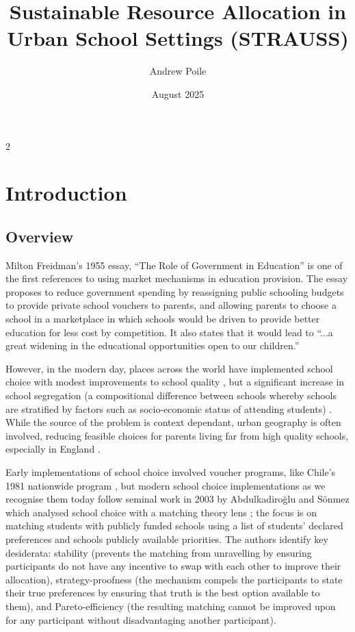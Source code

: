 \documentclass{article}
\title{Sustainable Resource Allocation in Urban School Settings (STRAUSS)}
\author{Andrew Poile}
\date{August 2025}
\begin{document}
\maketitle

\begin{multicols}{2}
\section{Introduction}
\subsection{Overview}
Milton Freidman's 1955 essay, \enquote{The Role of Government in Education} \cite{friedmanRoleGovernmentEducation1955} is one of the first references to using market mechanisms in education provision. The essay proposes to reduce government spending by reassigning public schooling budgets to provide private school vouchers to parents, and allowing parents to choose a school in a marketplace in which schools would be driven to provide better education for less cost by competition. It also states that it would lead to \enquote{...a great widening in the educational opportunities open to our children.}

However, in the modern day, places across the world have implemented school choice with modest improvements to school quality \cite{gibbonsChoiceCompetitionPupil2008,hsiehEffectsGeneralizedSchool2006,gleasonEvaluationCharterSchool,eppleSchoolVouchersSurvey2017,quintero-fragozoEffectsSpatialCompetition2023}, but a significant increase in school segregation (a compositional difference between schools whereby schools are stratified by factors such as socio-economic status of attending students) \cite{wilsonSchoolChoiceCity2019}. While the source of the problem is context dependant, urban geography is often involved, reducing feasible choices for parents living far from high quality schools, especially in England \cite{burgessParentalChoicePrimary2011a,burgessSchoolChoiceEngland2019}.

Early implementations of school choice involved voucher programs, like Chile's 1981 nationwide program \cite{hsiehEffectsGeneralizedSchool2006}, but modern school choice implementations as we recognise them today follow seminal work in 2003 by Abdulkadiroğlu and Sönmez which analysed school choice with a matching theory lens \cite{abdulkadirogluSchoolChoiceMechanism2003}; the focus is on matching students with publicly funded schools using a list of students' declared preferences and schools publicly available priorities. The authors identify key desiderata: stability (prevents the matching from unravelling by ensuring participants do not have any incentive to swap with each other to improve their allocation), strategy-proofness (the mechanism compels the participants to state their true preferences by ensuring that truth is the best option available to them), and Pareto-efficiency (the resulting matching cannot be improved upon for any participant without disadvantaging another participant). %


\end{multicols}
\end{document}
